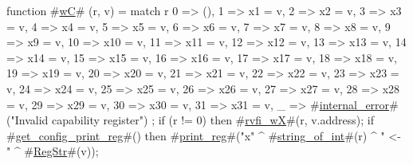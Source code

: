 function #\hyperref[sailRISCVzwC]{wC}# (r, v) = {
  match r {
    0  => (),
    1  => x1 = v,
    2  => x2 = v,
    3  => x3 = v,
    4  => x4 = v,
    5  => x5 = v,
    6  => x6 = v,
    7  => x7 = v,
    8  => x8 = v,
    9  => x9 = v,
    10 => x10 = v,
    11 => x11 = v,
    12 => x12 = v,
    13 => x13 = v,
    14 => x14 = v,
    15 => x15 = v,
    16 => x16 = v,
    17 => x17 = v,
    18 => x18 = v,
    19 => x19 = v,
    20 => x20 = v,
    21 => x21 = v,
    22 => x22 = v,
    23 => x23 = v,
    24 => x24 = v,
    25 => x25 = v,
    26 => x26 = v,
    27 => x27 = v,
    28 => x28 = v,
    29 => x29 = v,
    30 => x30 = v,
    31 => x31 = v,
    _  => #\hyperref[sailRISCVzinternalzyerror]{internal\_error}#("Invalid capability register")
  };
  if (r != 0) then {
     #\hyperref[sailRISCVzrvfizywX]{rvfi\_wX}#(r, v.address);
     if #\hyperref[sailRISCVzgetzyconfigzyprintzyreg]{get\_config\_print\_reg}#() then
       #\hyperref[sailRISCVzprintzyreg]{print\_reg}#("x" ^ #\hyperref[sailRISCVzstringzyofzyint]{string\_of\_int}#(r) ^ " <- " ^ #\hyperref[sailRISCVzRegStr]{RegStr}#(v));
  }
}
